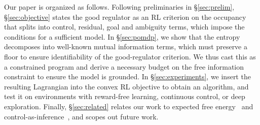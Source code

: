 Our paper is organized as follows.
Following preliminaries in \S\ref{sec:prelim}, \S\ref{sec:objective} states the good regulator as an RL criterion on the occupancy that splits into control, residual, goal and ambiguity terms, which impose the conditions for a sufficient model.
In \S\ref{sec:pomdp}, we show that the entropy decomposes into well-known mutual information terms, which must preserve a floor to ensure identifiability of the good-regulator criterion.
We thus cast this as a constrained program and derive a necessary budget on the free information constraint to ensure the model is grounded.
In \S\ref{sec:experiments}, we insert the resulting Lagrangian into the convex RL objective to obtain an algorithm, and test it on environments with reward-free learning, continuous control, or deep exploration.
Finally, \S\ref{sec:related} relates our work to expected free energy~\citep{Friston-active15} and control-as-inference~\citep{Levine-reinforcement18}, and scopes out future work.
